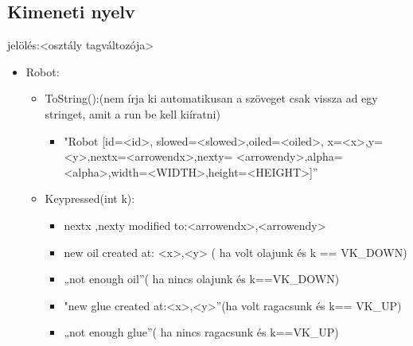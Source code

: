 
\subsection{Kimeneti nyelv}
jelölés:<osztály tagváltozója>
\begin{itemize}
\item Robot: 
	\begin{itemize}
	\item ToString():(nem írja ki automatikusan a szöveget csak vissza ad egy stringet, amit a run be kell kiíratni)
	        \begin{itemize}
	\item "Robot [id=<id>,  slowed=<slowed>,oiled=<oiled>, x=<x>,y=<y>,nextx=<arrowendx>,nexty=
	        <arrowendy>,alpha=<alpha>,width=<WIDTH>,height=<HEIGHT>]” 
	        \end{itemize}
	\item Keypressed(int k):
	       \begin{itemize}
	        \item nextx ,nexty modified to:<arrowendx>,<arrowendy>
            \item new oil created at: <x>,<y> ( ha volt olajunk és k == VK\_DOWN)
            \item „not enough oil”( ha nincs olajunk és k==VK\_DOWN)
            \item "new glue created at:<x>,<y>”(ha volt ragacsunk és k== VK\_UP)
            \item „not enough glue”( ha nincs ragacsunk és k==VK\_UP)

	       \end{itemize}
	\end{itemize}
	

\end{itemize}
